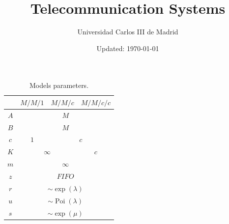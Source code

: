 \documentclass[
	12pt,
	twoside
]{book}
\title{Telecommunication Systems}
\author{Universidad Carlos III de Madrid}
\date{Updated: \today}
\begin{document}
\begin{table}[H]
	\centering
	\begin{tabular}{|c|c|c|c|}
		\hline
		& $M/M/1$ & $M/M/c$ & $M/M/c/c$ \\
		\hline
		$A$ & \multicolumn{3}{c|}{$M$} \\
		\hline
		$B$ & \multicolumn{3}{c|}{$M$} \\
		\hline
		$c$ & $1$ & \multicolumn{2}{c|}{$c$} \\
		\hline
		$K$ & \multicolumn{2}{c|}{$\infty$} & $c$ \\
		\hline
		$m$ & \multicolumn{3}{c|}{$\infty$} \\
		\hline
		$z$ & \multicolumn{3}{c|}{$FIFO$} \\
		\hline
		$r$ & \multicolumn{3}{c|}{$\sim \operatorname{exp} (\lambda)$} \\
		\hline
		$u$ & \multicolumn{3}{c|}{$\sim \operatorname{Poi} (\lambda)$} \\
		\hline
		$s$ & \multicolumn{3}{c|}{$\sim \operatorname{exp} (\mu)$} \\
		\hline
	\end{tabular}
	\caption{
		\label{tab:summary_models_1}
		Models parameters.
	}
\end{table}
\end{document}
